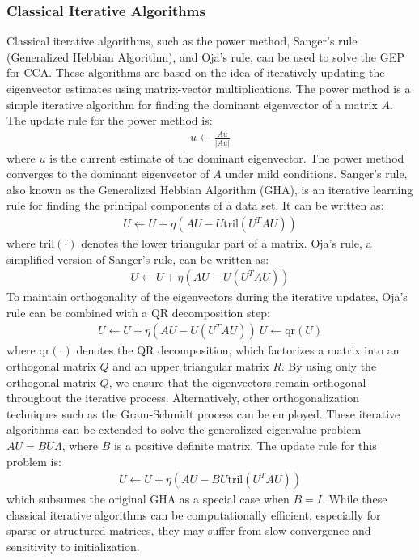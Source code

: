 \subsubsection{Classical Iterative Algorithms}
Classical iterative algorithms, such as the power method, Sanger's rule (Generalized Hebbian Algorithm), and Oja's rule, can be used to solve the GEP for CCA. These algorithms are based on the idea of iteratively updating the eigenvector estimates using matrix-vector multiplications.
The power method is a simple iterative algorithm for finding the dominant eigenvector of a matrix $A$. The update rule for the power method is:
\begin{align}
u \leftarrow \frac{A u}{|A u|}
\end{align}
where $u$ is the current estimate of the dominant eigenvector. The power method converges to the dominant eigenvector of $A$ under mild conditions.
Sanger's rule, also known as the Generalized Hebbian Algorithm (GHA), is an iterative learning rule for finding the principal components of a data set. It can be written as:
\begin{align}
U \leftarrow U + \eta \left( A U - U \text{tril}(U^T A U) \right)
\end{align}
where $\text{tril}(\cdot)$ denotes the lower triangular part of a matrix.
Oja's rule, a simplified version of Sanger's rule, can be written as:
\begin{align}
U \leftarrow U + \eta \left( A U - U (U^T A U) \right)
\end{align}
To maintain orthogonality of the eigenvectors during the iterative updates, Oja's rule can be combined with a QR decomposition step:
\begin{align}
U \leftarrow U + \eta \left( A U - U (U^T A U) \right) \
U \leftarrow \text{qr}(U)
\end{align}
where $\text{qr}(\cdot)$ denotes the QR decomposition, which factorizes a matrix into an orthogonal matrix $Q$ and an upper triangular matrix $R$. By using only the orthogonal matrix $Q$, we ensure that the eigenvectors remain orthogonal throughout the iterative process. Alternatively, other orthogonalization techniques such as the Gram-Schmidt process can be employed.
These iterative algorithms can be extended to solve the generalized eigenvalue problem $A U = B U \Lambda$, where $B$ is a positive definite matrix. The update rule for this problem is:
\begin{align}
U \leftarrow U + \eta \left( A U - B U \text{tril}(U^T A U) \right)
\end{align}
which subsumes the original GHA as a special case when $B=I$.
While these classical iterative algorithms can be computationally efficient, especially for sparse or structured matrices, they may suffer from slow convergence and sensitivity to initialization.

